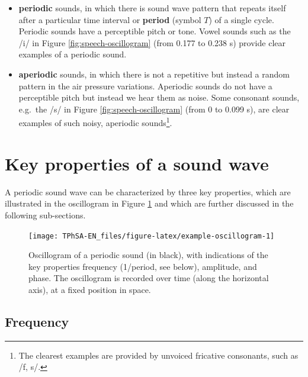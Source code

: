\documentclass[
]{book}
\begin{document}
\begin{itemize}
\item
  \textbf{periodic} sounds, in which there is sound wave pattern that repeats itself after a particular time interval or \textbf{period} (symbol \(T\)) of a single cycle. Periodic sounds have a perceptible pitch or tone. Vowel sounds such as the /i/ in Figure \ref{fig:speech-oscillogram} (from 0.177 to 0.238 s) provide clear examples of a periodic sound.
\item
  \textbf{aperiodic} sounds, in which there is not a repetitive but instead a random pattern in the air pressure variations. Aperiodic sounds do not have a perceptible pitch but instead we hear them as noise. Some consonant sounds, e.g.~the /s/ in Figure \ref{fig:speech-oscillogram} (from 0 to 0.099 s), are clear examples of such noisy, aperiodic sounds\footnote{The clearest examples are provided by unvoiced fricative consonants, such as /f, s/.}.
\end{itemize}

\section{Key properties of a sound wave}\label{sec:keypropertiessound}

A periodic sound wave can be characterized by three key properties, which are illustrated in the oscillogram in Figure \ref{fig:example-oscillogram} and which are further discussed in the following sub-sections.

\begin{figure}

{\centering \texttt{[image: TPhSA-EN\_files/figure-latex/example-oscillogram-1]} 

}

\caption{Oscillogram of a periodic sound (in black), with indications of the key properties frequency (1/period, see below), amplitude, and phase. The oscillogram is recorded over time (along the horizontal axis), at a fixed position in space.}\label{fig:example-oscillogram}
\end{figure}

\subsection{Frequency}\label{sec:frequency}
\end{document}
